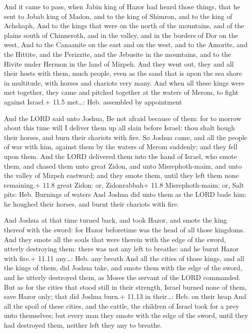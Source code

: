 And it came to pass, when Jabin king of Hazor had heard
those things, that he sent to Jobab king of Madon, and to the king of
Shimron, and to the king of Achshaph,  And to the kings that
were on the north of the mountains, and of the plains south of
Chinneroth, and in the valley, and in the borders of Dor on the west,
 And to the Canaanite on the east and on the west, and to
the Amorite, and the Hittite, and the Perizzite, and the Jebusite in the
mountains, and to the Hivite under Hermon in the land of Mizpeh.
 And they went out, they and all their hosts with them, much
people, even as the sand that is upon the sea shore in multitude, with
horses and chariots very many.  And when all these kings
were met together, they came and pitched together at the waters of
Merom, to fight against Israel.+ 11.5 met\ldots: Heb. assembled by
appointment

 And the LORD said unto Joshua, Be not afraid because of
them: for to morrow about this time will I deliver them up all slain
before Israel: thou shalt hough their horses, and burn their chariots
with fire.  So Joshua came, and all the people of war with
him, against them by the waters of Merom suddenly; and they fell upon
them.  And the LORD delivered them into the hand of Israel,
who smote them, and chased them unto great Zidon, and unto
Misrephoth-maim, and unto the valley of Mizpeh eastward; and they smote
them, until they left them none remaining.+ 11.8 great Zidon: or,
Zidonrabbah+ 11.8 Misrephoth-maim: or, Salt pits: Heb. Burnings of
waters  And Joshua did unto them as the LORD bade him: he
houghed their horses, and burnt their chariots with fire.

 And Joshua at that time turned back, and took Hazor, and
smote the king thereof with the sword: for Hazor beforetime was the head
of all those kingdoms.  And they smote all the souls that
were therein with the edge of the sword, utterly destroying them: there
was not any left to breathe: and he burnt Hazor with fire.+ 11.11
any\ldots: Heb. any breath  And all the cities of those
kings, and all the kings of them, did Joshua take, and smote them with
the edge of the sword, and he utterly destroyed them, as Moses the
servant of the LORD commanded.  But as for the cities that
stood still in their strength, Israel burned none of them, save Hazor
only; that did Joshua burn.+ 11.13 in their\ldots: Heb. on their heap
 And all the spoil of these cities, and the cattle, the
children of Israel took for a prey unto themselves; but every man they
smote with the edge of the sword, until they had destroyed them, neither
left they any to breathe.

